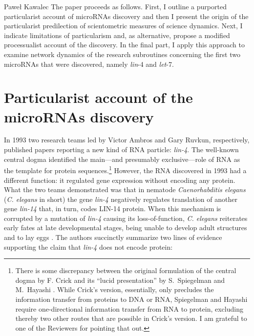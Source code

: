 \begin{artengenv}{Paweł Kawalec}
The paper proceeds as follows. First, I outline a purported particularist account of microRNAs discovery and then I present the origin of the particularist predilection of scientometric measures of science dynamics. Next, I indicate limitations of particularism and, as alternative, propose a modified processualist account of the discovery. In the final part, I apply this approach to examine network dynamics of the research subroutines concerning the first two microRNAs that were discovered, namely \textit{lin}-4 and \textit{let}-7.

\section{Particularist account of the microRNAs discovery}
In 1993 two research teams led by Victor Ambros and Gary Ruvkun, respectively, published papers reporting a new kind of RNA particle: \textit{lin-4}. The well-known central dogma identified the main---and presumably exclusive---role of RNA as the template for protein sequences.\footnote{There is some discrepancy between the original formulation of the central dogma by F. Crick
\parencite*[][]{crick_central_1970} %
 and its ``lucid presentation'' 
\parencite[][pp.297–298]{watson_molecular_1965} %
 by S.~Spiegelman and M.~Hayashi 
\parencite*[][]{spiegelman_present_1963}. %
 While Crick's version, essentially, only precludes the information transfer from proteins to DNA or RNA, Spiegelman and Hayashi require one-directional information transfer from RNA to protein, excluding thereby two other routes that are possible in Crick's version. I am grateful to one of the Reviewers for pointing that out.} However, the RNA discovered in 1993 had a different function: it regulated gene expression without encoding any protein. What the two teams demonstrated was that in nematode \textit{Caenorhabditis elegans} (\textit{C. elegans} in short) the gene \textit{lin-4} negatively regulates translation of another gene \textit{lin-14} that, in turn, codes LIN-14 protein. When this mechanism is corrupted by a mutation of \textit{lin-4} causing its loss-of-function, \textit{C. elegans} reiterates early fates at late developmental stages, being unable to develop adult structures and to lay eggs 
\parencite[][]{lee_c_1993}. %
 The authors succinctly summarize two lines of evidence supporting the claim that \textit{lin-4} does not encode protein:


\end{artengenv}
